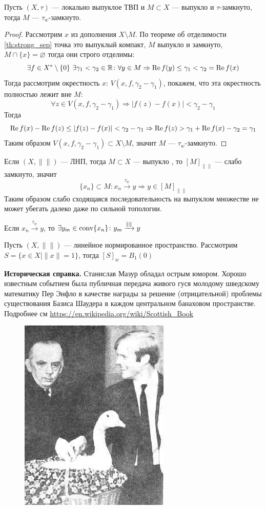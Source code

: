 \begin{theorem}[Мазур]\label{th:mazur}
	Пусть $(X,\tau)$ --- локально выпуклое ТВП и $M \subset X$ --- выпукло и $\tau$-замкнуто, тогда $M$ --- $\tau_w$-замкнуто.
\end{theorem}
\begin{proof}
	Рассмотрим $x$ из дополнения $ X \setminus M$. По теореме об отделимости \ref{th:strong_sep} точка это выпуклый компакт, $M$ выпукло и замкнуто, $M \cap \{x\} = \varnothing$ тогда они строго отделимы:
	$$
	\exists f \in X^*\setminus \{0\} \ \exists \gamma_1 < \gamma_2 \in \mathbb{R}\colon \forall y \in M \Rightarrow \operatorname{Re} f(y) \leq \gamma_1 < \gamma_2 =\operatorname{Re} f(x)
	$$
	Тогда рассмотрим окрестность $x$: $V(x,f, \gamma_2 - \gamma_1)$, покажем, что эта окрестность полностью лежит вне $M$: 
	$$
	\forall z \in V(x,f,\gamma_2 - \gamma_1) \Rightarrow |f(z) - f(x)| < \gamma_2 - \gamma_1
	$$
	Тогда 
	$$
	\operatorname{Re} f(x) - \operatorname{Re} f(z) \leq |f(z) - f(x)| < \gamma_2 - \gamma_1 \Rightarrow \operatorname{Re} f(z) > \gamma_1 + \operatorname{Re} f(x)  - \gamma_2 = \gamma_1
	$$
	Таким образом $V(x,f,\gamma_2 - \gamma_1) \subset X \setminus M$, значит $M$ --- $\tau_w$-замкнуто.
\end{proof}
\begin{next0}
	Если $(X, \|\|)$ --- ЛНП, тогда $M \subset X$ --- выпукло , то $[M]_{\|\|}$ --- слабо замкнуто, значит
	$$
	\{x_n\} \subset M\colon x_n \xrightarrow{\tau_w} y \Rightarrow  y \in [M]_{\|\|}
	$$
	Таким образом слабо сходящаяся последовательность на выпуклом множестве не может убегать далеко даже по сильной топологии.
\end{next0}
\begin{next0}
	Если $x_n \xrightarrow{\tau_w} y$, то $\exists y_m \in \operatorname{conv}\{x_n\}\colon y_{m} \xrightarrow{\|\|} y$
\end{next0}

\begin{next0}
	Пусть $(X, \|\|)$ --- линейное нормированное пространство. Рассмотрим $S = \{x \in X\mid \|x\|  = 1\}$, тогда $[S]_w = B_1(0)$
\end{next0}
\textbf{Историческая справка.} Станислав Мазур обладал острым юмором. Хорошо известным событием была публичная передача живого гуся молодому шведскому математику Пер Энфло в качестве награды за решение (отрицательной) проблемы существования Базиса Шаудера в каждом центральном банаховом пространстве. Подробнее см \url{https://en.wikipedia.org/wiki/Scottish_Book}

\begin{figure}[h!]
	\centering
	\includegraphics[scale=2]{pic/MazurGes.jpg}
\end{figure}
